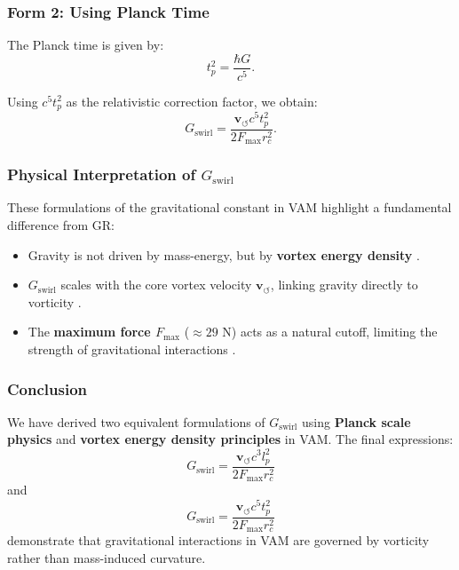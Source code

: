 \subsubsection*{Form 2: Using Planck Time}
The Planck time is given by:
\begin{equation*}
    t_p^2 = \frac{\hbar G}{c^5}.
\end{equation*}

Using \( c^5 t_p^2 \) as the relativistic correction factor, we obtain:
\begin{equation*}
     G_\text{swirl} = \frac{\mathbf{v}_{\scriptscriptstyle\boldsymbol{\circlearrowleft}} c^5 t_p^2}{2 F_{\max} r_c^2}.
\end{equation*}

\subsubsection*{Physical Interpretation of \(  G_\text{swirl} \)}
These formulations of the gravitational constant in VAM highlight a fundamental difference from GR:
\begin{itemize}
    \item Gravity is not driven by mass-energy, but by \textbf{vortex energy density} \cite{barcelo_superfluid}.
    \item \(  G_\text{swirl} \) scales with the core vortex velocity \( \mathbf{v}_{\scriptscriptstyle\boldsymbol{\circlearrowleft}} \), linking gravity directly to vorticity \cite{moffatt_helicity}.
    \item The \textbf{maximum force \( F_{\max} \)} ($\approx 29$ N) acts as a natural cutoff, limiting the strength of gravitational interactions \cite{schiller_max_force}.
\end{itemize}

\subsubsection*{Conclusion}
We have derived two equivalent formulations of \(  G_\text{swirl} \) using \textbf{Planck scale physics} and \textbf{vortex energy density principles} in VAM. The final expressions:
\begin{equation*}
     G_\text{swirl} = \frac{\mathbf{v}_{\scriptscriptstyle\boldsymbol{\circlearrowleft}} c^3 l_p^2}{2 F_{\max} r_c^2}
\end{equation*}
and
\begin{equation*}
     G_\text{swirl} = \frac{\mathbf{v}_{\scriptscriptstyle\boldsymbol{\circlearrowleft}} c^5 t_p^2}{2 F_{\max} r_c^2}
\end{equation*}
demonstrate that gravitational interactions in VAM are governed by vorticity rather than mass-induced curvature.